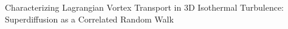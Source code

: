 \documentclass[]{article}
\begin{document}
Characterizing Lagrangian Vortex Transport in 3D Isothermal Turbulence: Superdiffusion as a Correlated Random Walk
\end{document}
